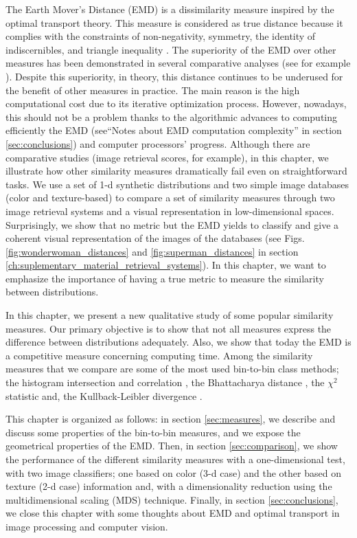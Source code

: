 The Earth Mover's Distance (EMD) \citep{Rubner.Tomasi.ea:IJCV:2000} is a dissimilarity measure inspired by the optimal transport theory. This measure is considered as true distance because it complies with the constraints of non-negativity, symmetry, the identity of indiscernibles, and triangle inequality \citep{Peyre.Cuturi:arXiv:2018}. The superiority of the EMD over other measures has been demonstrated in several comparative analyses (see for example \citep{Puzicha.Buhmann.ea:ICCV:1999, Rubner.Tomasi.ea:IJCV:2000}).  Despite this superiority, in theory, this distance continues to be underused for the benefit of other measures in practice. The main reason is the high computational cost due to its iterative optimization process. However, nowadays, this should not be a problem thanks to the algorithmic advances to computing efficiently the EMD (see``Notes about EMD computation complexity'' in section \ref{sec:conclusions}) and computer processors' progress. Although there are comparative studies (image retrieval scores, for example), in this chapter, we illustrate how other similarity measures dramatically fail even on straightforward tasks. We use a set of 1-d synthetic distributions and two simple image databases (color and texture-based) to compare a set of similarity measures through two image retrieval systems and a visual representation in low-dimensional spaces. Surprisingly, we show that no metric but the EMD yields to classify and give a coherent visual representation of the images of the databases (see Figs. \ref{fig:wonderwoman_distances} and \ref{fig:superman_distances} in section \ref{ch:suplementary_material_retrieval_systems}). In this chapter, we want to emphasize the importance of having a true metric to measure the similarity between distributions.

In this chapter, we present a new qualitative study of some popular similarity measures. Our primary objective is to show that not all measures express the difference between distributions adequately. Also, we show that today the EMD is a competitive measure concerning computing time. Among the similarity measures that we compare are some of the most used bin-to-bin class methods; the histogram intersection and correlation \citep{Nejhum.Ho.ea:CVPR:2008}, the Bhattacharya distance \citep{So.Chung:JPR:2017}, the $\chi^2$ statistic and, the  Kullback-Leibler divergence \citep{Klein.Frintrop:CV:2011}. 

This chapter is organized as follows: in section \ref{sec:measures}, we describe and discuss some properties of the bin-to-bin measures, and we expose the geometrical properties of the EMD. Then, in section \ref{sec:comparison}, we show the performance of the different similarity measures with a one-dimensional test, with two image classifiers; one based on color (3-d case) and the other based on texture (2-d case) information and, with a dimensionality reduction using the multidimensional scaling (MDS) technique. Finally, in section \ref{sec:conclusions}, we close this chapter with some thoughts about EMD and optimal transport in image processing and computer vision.


